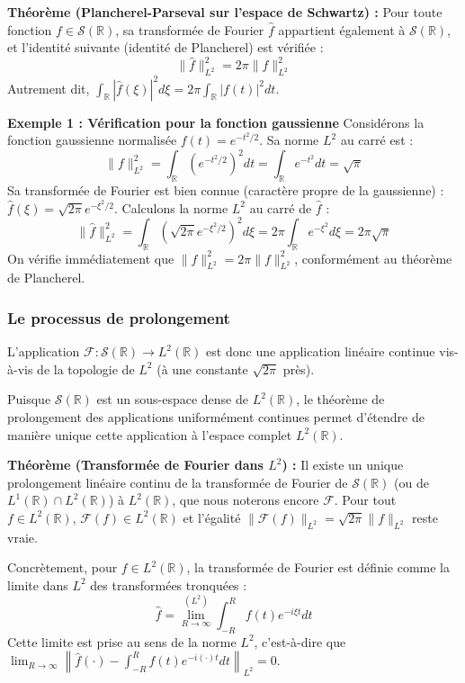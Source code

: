 \documentclass[11pt,a4paper]{article}
\begin{document}
\textbf{Théorème (Plancherel-Parseval sur l'espace de Schwartz) :}
Pour toute fonction $f \in \mathcal{S}(\mathbb{R})$, sa transformée de Fourier $\hat{f}$ appartient également à $\mathcal{S}(\mathbb{R})$, et l'identité suivante (identité de Plancherel) est vérifiée :
$$ \|\hat{f}\|_{L^2}^2 = 2\pi \|f\|_{L^2}^2 $$
Autrement dit, $\int_{\mathbb{R}} |\hat{f}(\xi)|^2 d\xi = 2\pi \int_{\mathbb{R}} |f(t)|^2 dt$.

\textbf{Exemple 1 : Vérification pour la fonction gaussienne}
Considérons la fonction gaussienne normalisée $f(t) = e^{-t^2/2}$.
Sa norme $L^2$ au carré est :
$$ \|f\|_{L^2}^2 = \int_{\mathbb{R}} (e^{-t^2/2})^2 dt = \int_{\mathbb{R}} e^{-t^2} dt = \sqrt{\pi} $$
Sa transformée de Fourier est bien connue (caractère propre de la gaussienne) : $\hat{f}(\xi) = \sqrt{2\pi} e^{-\xi^2/2}$.
Calculons la norme $L^2$ au carré de $\hat{f}$ :
$$ \|\hat{f}\|_{L^2}^2 = \int_{\mathbb{R}} (\sqrt{2\pi} e^{-\xi^2/2})^2 d\xi = 2\pi \int_{\mathbb{R}} e^{-\xi^2} d\xi = 2\pi \sqrt{\pi} $$
On vérifie immédiatement que $\|\hat{f}\|_{L^2}^2 = 2\pi \|f\|_{L^2}^2$, conformément au théorème de Plancherel.

\subsubsection*{Le processus de prolongement}

L'application $\mathcal{F} : \mathcal{S}(\mathbb{R}) \to L^2(\mathbb{R})$ est donc une application linéaire continue vis-à-vis de la topologie de $L^2$ (à une constante $\sqrt{2\pi}$ près).

Puisque $\mathcal{S}(\mathbb{R})$ est un sous-espace dense de $L^2(\mathbb{R})$, le théorème de prolongement des applications uniformément continues permet d'étendre de manière unique cette application à l'espace complet $L^2(\mathbb{R})$.

\textbf{Théorème (Transformée de Fourier dans $L^2$) :}
Il existe un unique prolongement linéaire continu de la transformée de Fourier de $\mathcal{S}(\mathbb{R})$ (ou de $L^1(\mathbb{R}) \cap L^2(\mathbb{R})$) à $L^2(\mathbb{R})$, que nous noterons encore $\mathcal{F}$.
Pour tout $f \in L^2(\mathbb{R})$, $\mathcal{F}(f) \in L^2(\mathbb{R})$ et l'égalité $\|\mathcal{F}(f)\|_{L^2} = \sqrt{2\pi} \|f\|_{L^2}$ reste vraie.

Concrètement, pour $f \in L^2(\mathbb{R})$, la transformée de Fourier est définie comme la limite dans $L^2$ des transformées tronquées :
$$ \hat{f} = \lim_{R \to \infty}^{(L^2)} \int_{-R}^{R} f(t) e^{-i\xi t} dt $$
Cette limite est prise au sens de la norme $L^2$, c'est-à-dire que $\lim_{R \to \infty} \left\| \hat{f}(\cdot) - \int_{-R}^{R} f(t) e^{-i(\cdot)t} dt \right\|_{L^2} = 0$.
\end{document}
